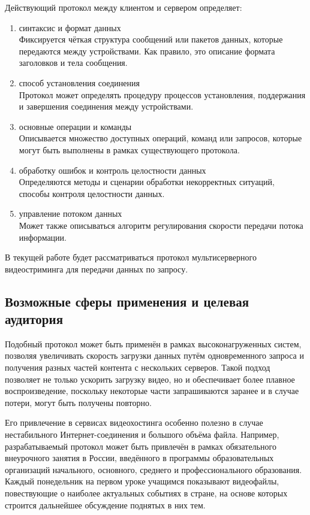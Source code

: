 Действующий протокол между клиентом и сервером определяет:
\begin{enumerate}
	\item синтаксис и формат данных \\
	Фиксируется чёткая структура сообщений или пакетов данных, которые передаются между устройствами. Как правило, это описание формата заголовков и тела сообщения.
	
	\item способ установления соединения \\
	Протокол может определять процедуру процессов установления, поддержания и завершения соединения между устройствами. 
	
	\item основные операции и команды \\
	Описывается множество доступных операций, команд или запросов, которые могут быть выполнены в рамках существующего протокола. 
	
	\item обработку ошибок и контроль целостности данных \\
	Определяются методы и сценарии обработки некорректных ситуаций, способы контроля целостности данных.
	
	\item управление потоком данных \\
	Может также описываться алгоритм регулирования скорости передачи потока информации.
\end{enumerate}

В текущей работе будет рассматриваться протокол мультисерверного видеостриминга для передачи данных по запросу. \\

\subsection{Возможные сферы применения и целевая аудитория}
Подобный протокол может быть применён в рамках высоконагруженных систем, позволяя увеличивать скорость загрузки данных путём одновременного запроса и получения разных частей контента с нескольких серверов. Такой подход позволяет не только ускорить загрузку видео, но и обеспечивает более плавное воспроизведение, поскольку некоторые части запрашиваются заранее и в случае потери, могут быть получены повторно. 

Его привлечение в сервисах видеохостинга особенно полезно в случае нестабильного Интернет-соединения и большого объёма файла. Например, разрабатываемый протокол может быть привлечён в рамках обязательного внеурочного занятия в России, введённого в программы образовательных организаций начального, основного, среднего и профессионального образования. Каждый понедельник на первом уроке учащимся показывают видеофайлы, повествующие о наиболее актуальных событиях в стране, на основе которых строится дальнейшее обсуждение поднятых в них тем. 

